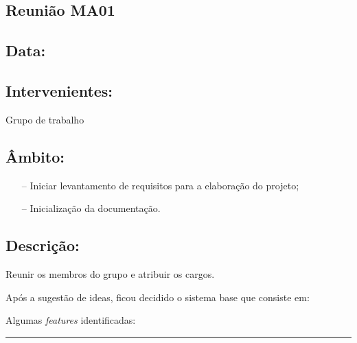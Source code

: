 
\subsection{Reunião MA01}\label{reuniaoMA01}

\subsection*{Data:}


\subsection*{Intervenientes:}
Grupo de trabalho

\subsection*{Âmbito:}
\begin{itemize}
\item[--] Iniciar levantamento de requisitos para a elaboração do projeto;
\item[--] Inicialização da documentação.
\end{itemize}

\subsection*{Descrição:}

\noindent Reunir os membros do grupo e atribuir os cargos.
\begin{itemize}

\end{itemize}

\noindent Após a sugestão de ideas, ficou decidido o sistema base que consiste em:

\begin{itemize}

\end{itemize}

\noindent Algumas \textit{features} identificadas:

\begin{itemize}
	
\end{itemize}


\noindent \rule{\linewidth}{0.4pt}
\newline
